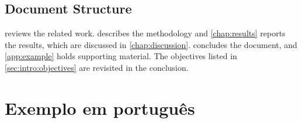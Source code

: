 \subsection{Document Structure}
\label{sec:intro:structure}

 reviews the related work. 
describes the methodology and \cref{chap:results} reports the results, which
are discussed in \cref{chap:discussion}.  concludes the
document, and \cref{app:example} holds supporting material. The objectives
listed in \cref{sec:intro:objectives} are revisited in the conclusion.

\section{Exemplo em português}
\label{sec:intro:pt}

